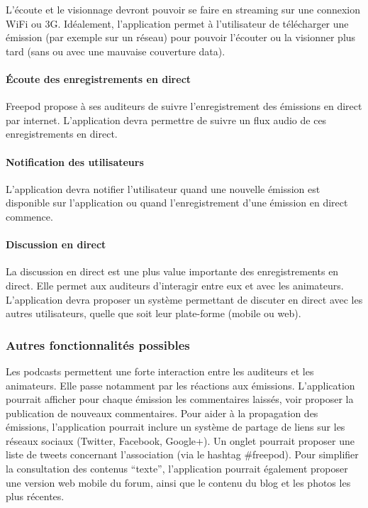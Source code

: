 \documentclass[11pt, french]{report}
\begin{document}
L’écoute et le visionnage devront pouvoir se faire en streaming sur une connexion WiFi ou 3G. Idéalement, l’application permet à l’utilisateur de télécharger une émission (par exemple sur un réseau) pour pouvoir l’écouter ou la visionner plus tard (sans ou avec une mauvaise couverture data).

\paragraph{Écoute des enregistrements en direct}

Freepod propose à ses auditeurs de suivre l’enregistrement des émissions en direct par internet. L’application devra permettre de suivre un flux audio de ces enregistrements en direct.

\paragraph{Notification des utilisateurs}

L’application devra notifier l’utilisateur quand une nouvelle émission est disponible sur l’application ou quand l’enregistrement d’une émission en direct commence.

\paragraph{Discussion en direct}

La discussion en direct est une plus value importante des enregistrements en direct. Elle permet aux auditeurs d'interagir entre eux et avec les animateurs. L’application devra proposer un système permettant de discuter en direct avec les autres utilisateurs, quelle que soit leur plate-forme (mobile ou web).

\subsubsection{Autres fonctionnalités possibles}

Les podcasts permettent une forte interaction entre les auditeurs et les animateurs. Elle passe notamment par les réactions aux émissions. L’application pourrait afficher pour chaque émission les commentaires laissés, voir proposer la publication de nouveaux commentaires.
Pour aider à la propagation des émissions, l’application pourrait inclure un système de partage de liens sur les réseaux sociaux (Twitter, Facebook, Google+).
Un onglet pourrait proposer une liste de tweets concernant l’association (via le hashtag \#freepod).
Pour simplifier la consultation des contenus “texte”, l’application pourrait également proposer une version web mobile du forum, ainsi que le contenu du blog et les photos les plus récentes.
\end{document}
